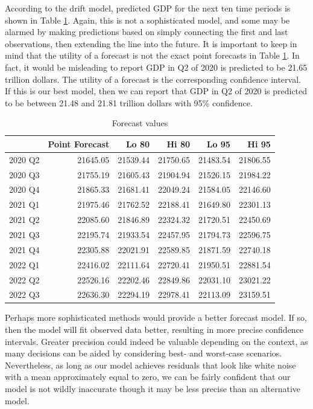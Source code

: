 \documentclass[
]{book}
\begin{document}
According to the drift model, predicted GDP for the next ten time periods is shown in Table \ref{tab:gdpdrift}. Again, this is not a sophisticated model, and some may be alarmed by making predictions based on simply connecting the first and last observations, then extending the line into the future. It is important to keep in mind that the utility of a forecast is not the exact point forecasts in Table \ref{tab:gdpdrift}. In fact, it would be misleading to report GDP in Q2 of 2020 is predicted to be 21.65 trillion dollars. The utility of a forecast is the corresponding confidence interval. If this is our best model, then we can report that GDP in Q2 of 2020 is predicted to be between 21.48 and 21.81 trillion dollars with 95\% confidence.

\begin{table}

\caption{\label{tab:gdpdrift}Forecast values}
\centering
\begin{tabular}[t]{l|r|r|r|r|r}
\hline
  & Point Forecast & Lo 80 & Hi 80 & Lo 95 & Hi 95\\
\hline
2020 Q2 & 21645.05 & 21539.44 & 21750.65 & 21483.54 & 21806.55\\
\hline
2020 Q3 & 21755.19 & 21605.43 & 21904.94 & 21526.15 & 21984.22\\
\hline
2020 Q4 & 21865.33 & 21681.41 & 22049.24 & 21584.05 & 22146.60\\
\hline
2021 Q1 & 21975.46 & 21762.52 & 22188.41 & 21649.80 & 22301.13\\
\hline
2021 Q2 & 22085.60 & 21846.89 & 22324.32 & 21720.51 & 22450.69\\
\hline
2021 Q3 & 22195.74 & 21933.54 & 22457.95 & 21794.73 & 22596.75\\
\hline
2021 Q4 & 22305.88 & 22021.91 & 22589.85 & 21871.59 & 22740.18\\
\hline
2022 Q1 & 22416.02 & 22111.64 & 22720.41 & 21950.51 & 22881.54\\
\hline
2022 Q2 & 22526.16 & 22202.46 & 22849.86 & 22031.10 & 23021.22\\
\hline
2022 Q3 & 22636.30 & 22294.19 & 22978.41 & 22113.09 & 23159.51\\
\hline
\end{tabular}
\end{table}

Perhaps more sophisticated methods would provide a better forecast model. If so, then the model will fit observed data better, resulting in more precise confidence intervals. Greater precision could indeed be valuable depending on the context, as many decisions can be aided by considering best- and worst-case scenarios. Nevertheless, as long as our model achieves residuals that look like white noise with a mean approximately equal to zero, we can be fairly confident that our model is not wildly inaccurate though it may be less precise than an alternative model.
\end{document}
